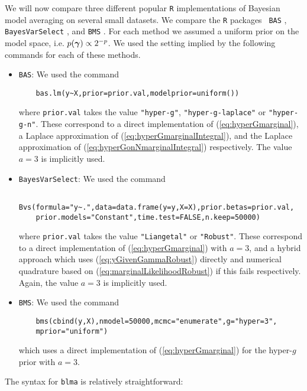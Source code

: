 We will now compare three different popular {\tt R} implementations of Bayesian
model averaging on several small datasets. We compare the {\tt R} packages {\tt
BAS} \citep{Clyde2017}, {\tt BayesVarSelect} \citep{Garcia-Donato2016}, and
{\tt BMS} \citep{Zeugner2015}. For each method we assumed a uniform prior on
the model space, i.e. $p({\boldsymbol \gamma})\propto 2^{-p}$. We used the setting implied
by the following commands for each of these methods.
\begin{itemize}
	\item {\tt BAS}: We used the command
	\begin{verbatim}
	bas.lm(y~X,prior=prior.val,modelprior=uniform())
	\end{verbatim}
	
    where \verb|prior.val| takes the value \verb|"hyper-g"|,
    \verb|"hyper-g-laplace"| or \verb|"hyper-g-n"|.  These correspond to a
    direct implementation of (\ref{eq:hyperGmarginal}), a Laplace approximation
    of (\ref{eq:hyperGmarginalIntegral}), and the Laplace approximation of
    (\ref{eq:hyperGonNmarginalIntegral}) respectively. The value $a=3$ is
    implicitly used.
	
	\item {\tt BayesVarSelect}: We used the command
	\begin{verbatim}
	Bvs(formula="y~.",data=data.frame(y=y,X=X),prior.betas=prior.val,
	prior.models="Constant",time.test=FALSE,n.keep=50000)
	\end{verbatim}
	
	
    \noindent where \verb|prior.val| takes the value \verb|"Liangetal"| or
    \verb|"Robust"|.  These correspond to a direct implementation of
    (\ref{eq:hyperGmarginal}) with $a=3$, and a hybrid approach which uses
    (\ref{eq:yGivenGammaRobust}) directly and numerical quadrature based on
    (\ref{eq:marginalLikelihoodRobust}) if this fails respectively.  Again, the
    value $a=3$ is implicitly used.
	
	\item {\tt BMS}: We used the command
	\begin{verbatim}
	bms(cbind(y,X),nmodel=50000,mcmc="enumerate",g="hyper=3",
	mprior="uniform")	
	\end{verbatim}
	
    \noindent which uses a direct implementation of (\ref{eq:hyperGmarginal})
    for the hyper-$g$ prior with $a=3$.
\end{itemize}

\noindent The syntax for {\tt blma} is relatively straightforward:

